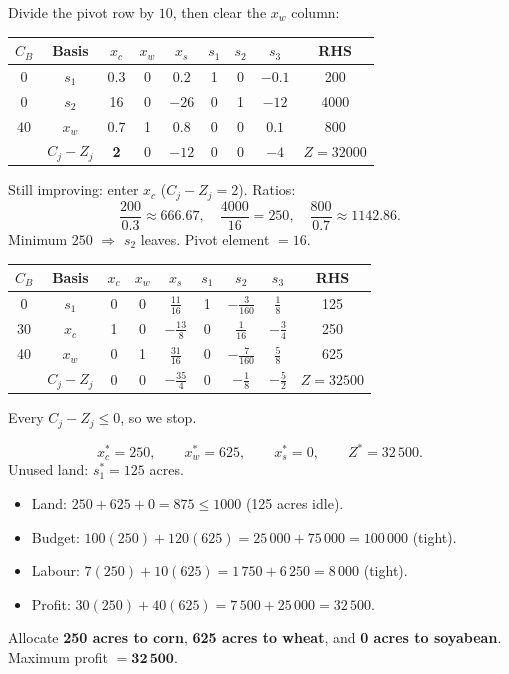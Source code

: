 Divide the pivot row by \(10\), then clear the \(x_w\) column:
\begin{center}
\renewcommand{\arraystretch}{1.2}
\begin{tabular}{c|c|ccc|ccc|c}
\toprule
\(C_B\) & Basis & \(x_c\) & \(x_w\) & \(x_s\) & \(s_1\) & \(s_2\) & \(s_3\) & RHS \\
\midrule
0 & \(s_1\) & \(0.3\) & 0 & \(0.2\) & 1 & 0 & \(-0.1\) & 200 \\
0 & \(s_2\) & 16 & 0 & \(-26\) & 0 & 1 & \(-12\) & 4000 \\
40 & \(x_w\) & \(0.7\) & 1 & \(0.8\) & 0 & 0 & \(0.1\) & 800 \\
\midrule
 & \(C_j-Z_j\) & \textbf{2} & 0 & \(-12\) & 0 & 0 & \(-4\) & \(Z=32000\) \\
\bottomrule
\end{tabular}
\end{center}

Still improving: enter \(x_c\) (\(C_j-Z_j=2\)). Ratios:
\[
  \frac{200}{0.3}\approx 666.67,\quad
  \frac{4000}{16}=250,\quad
  \frac{800}{0.7}\approx 1142.86.
\]
Minimum \(250\) \(\Rightarrow\) \(s_2\) leaves. Pivot element \(=16\).

\begin{center}
\renewcommand{\arraystretch}{1.2}
\begin{tabular}{c|c|ccc|ccc|c}
\toprule
\(C_B\) & Basis & \(x_c\) & \(x_w\) & \(x_s\) & \(s_1\) & \(s_2\) & \(s_3\) & RHS \\
\midrule
0 & \(s_1\) & 0 & 0 & \(\tfrac{11}{16}\) & 1 & \(-\tfrac{3}{160}\) & \(\tfrac{1}{8}\) & 125 \\
30 & \(x_c\) & 1 & 0 & \(-\tfrac{13}{8}\) & 0 & \(\tfrac{1}{16}\) & \(-\tfrac{3}{4}\) & 250 \\
40 & \(x_w\) & 0 & 1 & \(\tfrac{31}{16}\) & 0 & \(-\tfrac{7}{160}\) & \(\tfrac{5}{8}\) & 625 \\
\midrule
 & \(C_j-Z_j\) & 0 & 0 & \(-\tfrac{35}{4}\) & 0 & \(-\tfrac{1}{8}\) & \(-\tfrac{5}{2}\) & \(Z=32500\) \\
\bottomrule
\end{tabular}
\end{center}

Every \(C_j-Z_j\le 0\), so we stop.

\[
  x_c^*=250,\qquad x_w^*=625,\qquad x_s^*=0,\qquad Z^*=32\,500.
\]
Unused land: \(s_1^*=125\) acres.
\begin{itemize}
  \item Land: \(250+625+0=875\le 1000\) (125 acres idle).
  \item Budget: \(100(250)+120(625)=25\,000+75\,000=100\,000\) (tight).
  \item Labour: \(7(250)+10(625)=1\,750+6\,250=8\,000\) (tight).
  \item Profit: \(30(250)+40(625)=7\,500+25\,000=32\,500\).
\end{itemize}

\begin{resultbox}
Allocate \textbf{250 acres to corn}, \textbf{625 acres to wheat}, and \textbf{0 acres to soyabean}.
Maximum profit \(= \mathbf{32\,500}\).
\end{resultbox}
